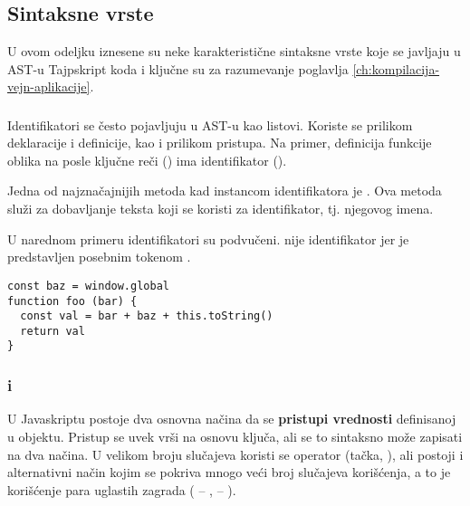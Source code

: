 \section{}
\label{sec:ts-simple-ast}

\subsection{Sintaksne vrste}

U ovom odeljku iznesene su neke karakteristične sintaksne vrste koje se javljaju u AST-u Tajpskript koda i ključne su za razumevanje poglavlja \cref{ch:kompilacija-vejn-aplikacije}.

\subsubsection{}
\label{ast:Identifier}

Identifikatori se često pojavljuju u AST-u kao listovi.
Koriste se prilikom deklaracije i definicije, kao i prilikom pristupa.
Na primer, definicija funkcije oblika  na posle ključne reči  () ima identifikator ().

Jedna od najznačajnijih metoda kad instancom identifikatora je .
Ova metoda služi za dobavljanje teksta koji se koristi za identifikator, tj. njegovog imena.

U narednom primeru identifikatori su podvučeni.
 nije identifikator jer je predstavljen posebnim tokenom .

\begin{lstlisting}[keywords={baz, window, global, foo, bar, val, toString},keywordstyle={\underbar}]
const baz = window.global
function foo (bar) {
  const val = bar + baz + this.toString()
  return val
}
\end{lstlisting}

\subsubsection{ i }
\label{ast:PropertyAccessExpression}
\label{ast:ElementAccessExpression}

U Javaskriptu postoje dva osnovna načina da se \textbf{pristupi vrednosti} definisanoj u objektu.
Pristup se uvek vrši na osnovu ključa, ali se to sintaksno može zapisati na dva načina.
U velikom broju slučajeva koristi se operator  (tačka, ), ali postoji i alternativni način kojim se pokriva mnogo veći broj slučajeva korišćenja, a to je korišćenje para uglastih zagrada (\code{[} -- , \code{]} -- ).

